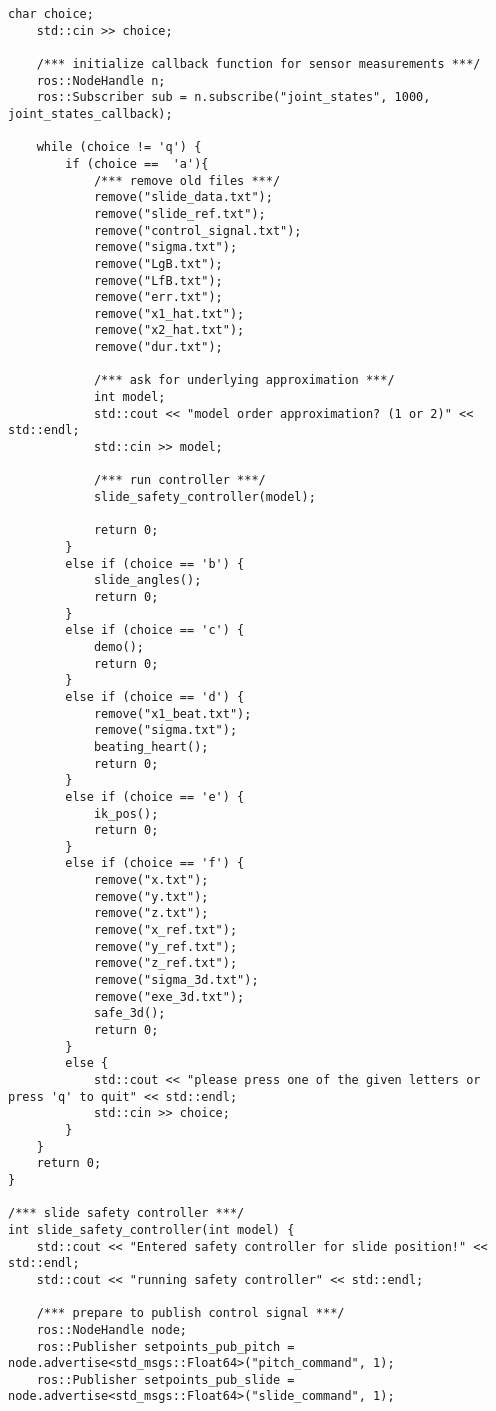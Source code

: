 \begin{lstlisting}[language=gedit]
    char choice;
    std::cin >> choice;

    /*** initialize callback function for sensor measurements ***/
    ros::NodeHandle n;
    ros::Subscriber sub = n.subscribe("joint_states", 1000, joint_states_callback);

    while (choice != 'q') {
        if (choice ==  'a'){
            /*** remove old files ***/
            remove("slide_data.txt"); 
            remove("slide_ref.txt");
            remove("control_signal.txt");
            remove("sigma.txt");
            remove("LgB.txt");
            remove("LfB.txt");
            remove("err.txt");
            remove("x1_hat.txt");
            remove("x2_hat.txt");
            remove("dur.txt");

            /*** ask for underlying approximation ***/ 
            int model;
            std::cout << "model order approximation? (1 or 2)" << std::endl;
            std::cin >> model;

            /*** run controller ***/
            slide_safety_controller(model);

            return 0;
        }
        else if (choice == 'b') {
            slide_angles();
            return 0;
        }
        else if (choice == 'c') {
            demo();
            return 0;
        }
        else if (choice == 'd') {
            remove("x1_beat.txt"); 
            remove("sigma.txt"); 
            beating_heart();
            return 0;
        }
        else if (choice == 'e') {
            ik_pos();
            return 0;
        }
        else if (choice == 'f') {
            remove("x.txt"); 
            remove("y.txt"); 
            remove("z.txt"); 
            remove("x_ref.txt"); 
            remove("y_ref.txt"); 
            remove("z_ref.txt"); 
            remove("sigma_3d.txt"); 
            remove("exe_3d.txt"); 
            safe_3d();
            return 0;
        }
        else {
            std::cout << "please press one of the given letters or press 'q' to quit" << std::endl;
            std::cin >> choice;
        }
    }
    return 0;
}

/*** slide safety controller ***/
int slide_safety_controller(int model) {
    std::cout << "Entered safety controller for slide position!" << std::endl;
    std::cout << "running safety controller" << std::endl;
   
    /*** prepare to publish control signal ***/ 
    ros::NodeHandle node;
    ros::Publisher setpoints_pub_pitch = node.advertise<std_msgs::Float64>("pitch_command", 1);
    ros::Publisher setpoints_pub_slide = node.advertise<std_msgs::Float64>("slide_command", 1);


\end{lstlisting}
